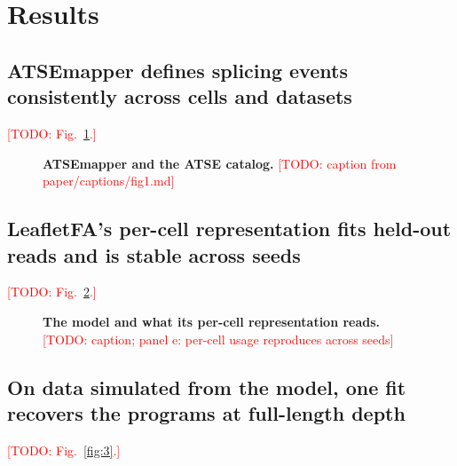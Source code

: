 \documentclass[webpdf,traditional,large,namedate]{oup-authoring-template}
\let\cite\citep
\newcommand{\todo}[1]{\textcolor{red}{[TODO: #1]}}
\begin{document}
\section{Results}

\subsection{ATSEmapper defines splicing events consistently across cells and datasets}
\todo{Fig.~\ref{fig:1}.}

\begin{figure}[!t]
\centering
\caption{\textbf{ATSEmapper and the ATSE catalog.} \todo{caption from paper/captions/fig1.md}}
\label{fig:1}
\end{figure}

\subsection{LeafletFA's per-cell representation fits held-out reads and is stable across seeds}
\todo{Fig.~\ref{fig:2}.}

\begin{figure}[!t]
\centering
\caption{\textbf{The model and what its per-cell representation reads.} \todo{caption; panel e: per-cell usage reproduces across seeds}}
\label{fig:2}
\end{figure}

\subsection{On data simulated from the model, one fit recovers the programs at full-length depth}
\todo{Fig.~\ref{fig:3}.}
\end{document}
